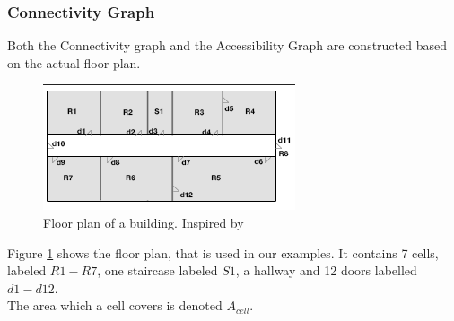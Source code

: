 \subsubsection{ \quad Connectivity Graph}
Both the Connectivity graph and the Accessibility Graph are constructed based on the actual floor plan. 

\begin{figure}[]%
\centering
\includegraphics[width=0.8\columnwidth]{images/floorplan.png}%
\caption{Floor plan of a building. Inspired by~\cite{Jensen:2009:GMB:1590953.1591000}}%
\label{fig:floortplan}%
\end{figure}%

Figure \ref{fig:floortplan} shows the floor plan, that is used in our examples.
It contains 7 cells, labeled $R1 - R7$, one staircase labeled $S1$, a hallway and 12 doors labelled $d1-d12$. \\
The area which a cell covers is denoted $A_{cell}$.

